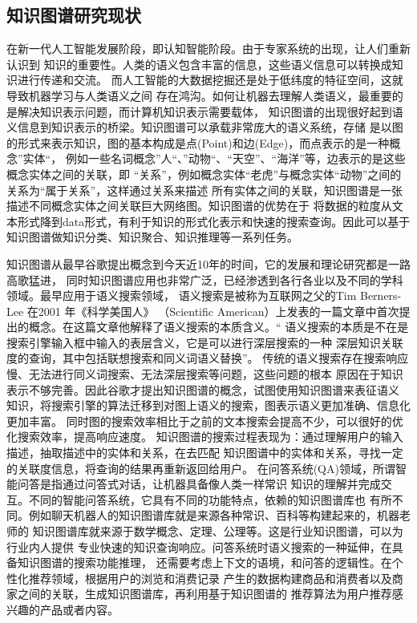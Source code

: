 \documentclass{standalone}
\begin{document}
\subsection{知识图谱研究现状}
在新一代人工智能发展阶段，即认知智能阶段。由于专家系统的出现，让人们重新认识到
知识的重要性。人类的语义包含丰富的信息，这些语义信息可以转换成知识进行传递和交流。
而人工智能的大数据挖掘还是处于低纬度的特征空间，这就导致机器学习与人类语义之间
存在鸿沟。如何让机器去理解人类语义，最重要的是解决知识表示问题，而计算机知识表示需要载体，
知识图谱的出现很好起到语义信息到知识表示的桥梁。知识图谱可以承载非常庞大的语义系统，存储
是以图的形式来表示知识，图的基本构成是点(Point)和边(Edge)，而点表示的是一种概念”实体“，
例如一些名词概念”人“、”动物“、“天空”、“海洋”等，边表示的是这些概念实体之间的关联，即
“关系”，例如概念实体“老虎”与概念实体“动物”之间的关系为“属于关系”，这样通过关系来描述
所有实体之间的关联，知识图谱是一张描述不同概念实体之间关联巨大网络图。知识图谱的优势在于
将数据的粒度从文本形式降到data形式，有利于知识的形式化表示和快速的搜索查询。因此可以基于
知识图谱做知识分类、知识聚合、知识推理等一系列任务。

知识图谱从最早谷歌提出概念到今天近10年的时间，它的发展和理论研究都是一路高歌猛进，
同时知识图谱应用也非常广泛，已经渗透到各行各业以及不同的学科领域。最早应用于语义搜索领域，
语义搜索是被称为互联网之父的Tim Berners-Lee 在2001 年《科学美国人》
（Scientific American）上发表的一篇文章中首次提出的概念。在这篇文章他解释了语义搜索的本质含义。“
语义搜索的本质是不在是搜索引擎输入框中输入的表层含义，它是可以进行深层搜索的一种
深层知识关联度的查询，其中包括联想搜索和同义词语义替换”。
传统的语义搜索存在搜索响应慢、无法进行同义词搜索、无法深层搜索等问题，这些问题的根本
原因在于知识表示不够完善。因此谷歌才提出知识图谱的概念，试图使用知识图谱来表征语义
知识，将搜索引擎的算法迁移到对图上语义的搜索，图表示语义更加准确、信息化更加丰富。
同时图的搜索效率相比于之前的文本搜索会提高不少，可以很好的优化搜索效率，提高响应速度。
知识图谱的搜索过程表现为：通过理解用户的输入描述，抽取描述中的实体和关系，在去匹配
知识图谱中的实体和关系，寻找一定的关联度信息，将查询的结果再重新返回给用户。
在问答系统(QA)领域，所谓智能问答是指通过问答式对话，让机器具备像人类一样常识
知识的理解并完成交互。不同的智能问答系统，它具有不同的功能特点，依赖的知识图谱库也
有所不同。例如聊天机器人的知识图谱库就是来源各种常识、百科等构建起来的，机器老师的
知识图谱库就来源于数学概念、定理、公理等。这是行业知识图谱，可以为行业内人提供
专业快速的知识查询响应。问答系统时语义搜索的一种延伸，在具备知识图谱的搜索功能推理，
还需要考虑上下文的语境，和问答的逻辑性。在个性化推荐领域，根据用户的浏览和消费记录
产生的数据构建商品和消费者以及商家之间的关联，生成知识图谱库，再利用基于知识图谱的
推荐算法为用户推荐感兴趣的产品或者内容。
\end{document}
